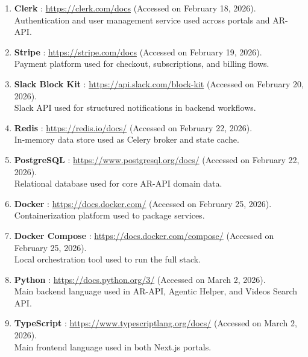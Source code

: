 \begin{enumerate}[leftmargin=0pt]
  \item \label{web:clerk} \textbf{Clerk} :
        \url{https://clerk.com/docs} (Accessed on February 18, 2026).\\
        Authentication and user management service used across portals and AR-API.

  \item \label{web:stripe} \textbf{Stripe} :
        \url{https://stripe.com/docs} (Accessed on February 19, 2026).\\
        Payment platform used for checkout, subscriptions, and billing flows.

  \item \label{web:slack_api} \textbf{Slack Block Kit} :
        \url{https://api.slack.com/block-kit} (Accessed on February 20, 2026).\\
        Slack API used for structured notifications in backend workflows.

  \item \label{web:redis} \textbf{Redis} :
        \url{https://redis.io/docs/} (Accessed on February 22, 2026).\\
        In-memory data store used as Celery broker and state cache.

  \item \label{web:postgresql} \textbf{PostgreSQL} :
        \url{https://www.postgresql.org/docs/} (Accessed on February 22, 2026).\\
        Relational database used for core AR-API domain data.

  \item \label{web:docker} \textbf{Docker} :
        \url{https://docs.docker.com/} (Accessed on February 25, 2026).\\
        Containerization platform used to package services.

  \item \label{web:dockercompose} \textbf{Docker Compose} :
        \url{https://docs.docker.com/compose/} (Accessed on February 25, 2026).\\
        Local orchestration tool used to run the full stack.

  \item \label{web:python} \textbf{Python} :
        \url{https://docs.python.org/3/} (Accessed on March 2, 2026).\\
        Main backend language used in AR-API, Agentic Helper, and Videos Search API.

  \item \label{web:typescript} \textbf{TypeScript} :
        \url{https://www.typescriptlang.org/docs/} (Accessed on March 2, 2026).\\
        Main frontend language used in both Next.js portals.


\end{enumerate}
